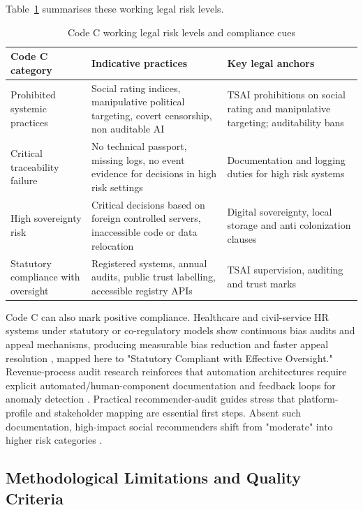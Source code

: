 \documentclass[11pt]{article}
\begin{document}
Table~\ref{tab:codeC_levels} summarises these working legal risk levels. \begin{table}[H] \centering \caption{Code C working legal risk levels and compliance cues} \label{tab:codeC_levels} \begin{tabular}{p{3cm}p{4.5cm}p{4.5cm}} \hline Code C category & Indicative practices & Key legal anchors \\ \hline Prohibited systemic practices & Social rating indices, manipulative political targeting, covert censorship, non auditable AI & TSAI prohibitions on social rating and manipulative targeting; auditability bans \parencites[31.4]{2977039}[68.5]{2977039} \\ Critical traceability failure & No technical passport, missing logs, no event evidence for decisions in high risk settings & Documentation and logging duties for high risk systems \parencites[19.5]{2977039}[68.6]{2977039} \\ High sovereignty risk & Critical decisions based on foreign controlled servers, inaccessible code or data relocation & Digital sovereignty, local storage and anti colonization clauses \parencites[33.2]{2977039}[33.4]{2977039} \\ Statutory compliance with oversight & Registered systems, annual audits, public trust labelling, accessible registry APIs & TSAI supervision, auditing and trust marks \parencites[68.7]{2977039} \\ \hline \end{tabular} \end{table}

Code C can also mark positive compliance. Healthcare and civil-service HR systems under statutory or co-regulatory models show continuous bias audits and appeal mechanisms, producing measurable bias reduction and faster appeal resolution \parencites[4]{0375818}, mapped here to "Statutory Compliant with Effective Oversight." Revenue-process audit research reinforces that automation architectures require explicit automated/human-component documentation and feedback loops for anomaly detection \parencites{6539584}. Practical recommender-audit guides stress that platform-profile and stakeholder mapping are essential first steps. Absent such documentation, high-impact social recommenders shift from "moderate" into higher risk categories \parencites[70]{2977039}[4]{0375818}{6539584}.

\subsection{Methodological Limitations and Quality Criteria}
\end{document}
